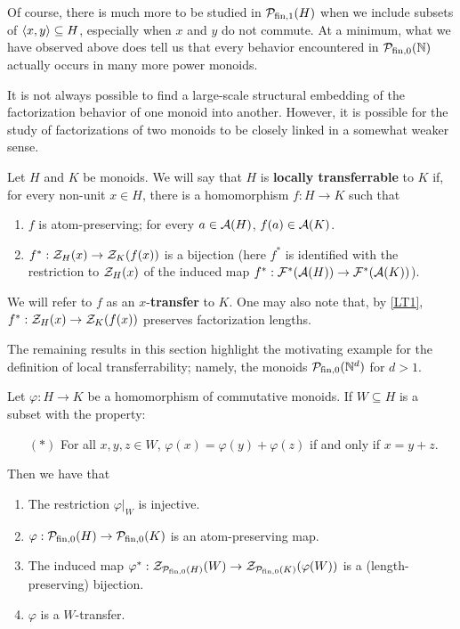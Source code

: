 Of course, there is much more to be studied in $\mathcal{P}_{\textrm{fin}, 1}(H)$ when we include subsets of $\langle x,y \rangle\subseteq H$, especially when $x$ and $y$ do not commute.
At a minimum, what we have observed above does tell us that every behavior encountered in ${\mathcal{P}_{\textrm{fin},0}(\mathbb{N})}$ actually occurs in many more power monoids.

It is not always possible to find a large-scale structural embedding of the factorization behavior of one monoid into another.  
However, it is possible for the study of factorizations of two monoids to be closely linked in a somewhat weaker sense.

\begin{defn} \label{def:local transfer}
	Let $H$ and $K$ be monoids. 
	We will say that $H$ is \textbf{locally transferrable} to $K$ if, for every non-unit $x\in H$, there is a homomorphism $f: H \to K$ such that 
	\begin{enumerate}[label={\rm ({\small LT}\arabic{*})}]
		\item $f$ is atom-preserving; for every $a\in \mathcal{A}(H)$, $f(a)\in \mathcal{A}(K)$. \label{LT1}
		\item $f^*:\mathcal{Z}_H(x) \to \mathcal{Z}_K(f(x))$ is a bijection (here $f^*$ is identified with the restriction to $\mathcal{Z}_H(x)$ of the induced map $f^*: \mathcal{F}^*(\mathcal{A}(H)) \to \mathcal{F}^*(\mathcal{A}(K))$). \label{LT2}
	\end{enumerate}
	We will refer to $f$ as an $x$-\textbf{transfer} to $K$.
	One may also note that, by \ref{LT1}, $f^*:\mathcal{Z}_H(x) \to \mathcal{Z}_K(f(x))$ preserves factorization lengths.
\end{defn}

The remaining results in this section highlight the motivating example for the definition of local transferrability; namely, the monoids $\mathcal{P}_{\textrm{fin}, 0}(\mathbb{N}^d)$ for $d>1$.

\begin{lemma}\label{lem:local-transport}
	Let $\varphi: H \to K$ be a homomorphism of commutative monoids. 
	If $W\subseteq H$ is a subset with the property:
	\begin{itemize}
		\item[$(*)$] For all $x,y,z\in W$, $\varphi(x) = \varphi(y) + \varphi(z)$ if and only if $x = y + z$.
	\end{itemize}
	Then we have that
	\begin{enumerate}[label={\rm (\roman{*})}]
		\item The restriction $\varphi|_W$ is injective.
		\item $\varphi:\mathcal{P}_{\textrm{fin}, 0}(H) \to \mathcal{P}_{\textrm{fin}, 0}(K)$ is an atom-preserving map.
		\item The induced map $\varphi^*:\mathcal{Z}_{\mathcal{P}_{\textrm{fin}, 0}(H)}(W) \to \mathcal{Z}_{\mathcal{P}_{\textrm{fin}, 0}(K)}(\varphi(W))$ is a (length-preserving) bijection.
		\item $\varphi$ is a $W$-transfer.
	\end{enumerate}
\end{lemma}

